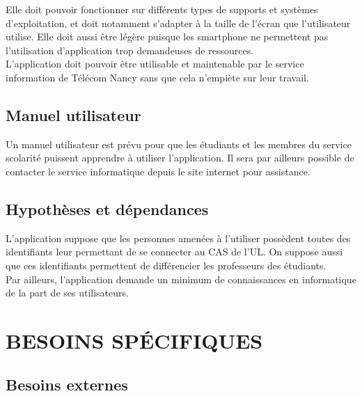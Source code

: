 \documentclass{scrreprt}
\begin{document}
\hspace{0.6cm}Elle doit pouvoir fonctionner sur différents types de supports et systèmes d'exploitation, et doit notamment s'adapter à la taille de l'écran que l'utilisateur utilise. Elle doit aussi être légère puisque les smartphone ne permettent pas l'utilisation d'application trop demandeuses de ressources.\\

\hspace{0.6cm}L'application doit pouvoir être utilisable et maintenable par le service information de Télécom Nancy sans que cela n'empiète sur leur travail.


\section{Manuel utilisateur}
\hspace{1cm}Un manuel utilisateur est prévu pour que les étudiants et les membres du service scolarité puissent apprendre à utiliser l'application. Il sera par ailleurs possible de contacter le service informatique depuis le site internet pour assistance.


\section{Hypothèses et dépendances}
\hspace{1cm}L'application suppose que les personnes amenées à l'utiliser possèdent toutes des identifiants leur permettant de se connecter au CAS de l'UL. On suppose aussi que ces identifiants permettent de différencier les professeurs des étudiants.\\

\hspace{1cm}Par ailleurs, l'application demande un minimum de connaissances en informatique de la part de ses utilisateurs.


\chapter{BESOINS SPÉCIFIQUES}

\section{Besoins externes}
\end{document}
